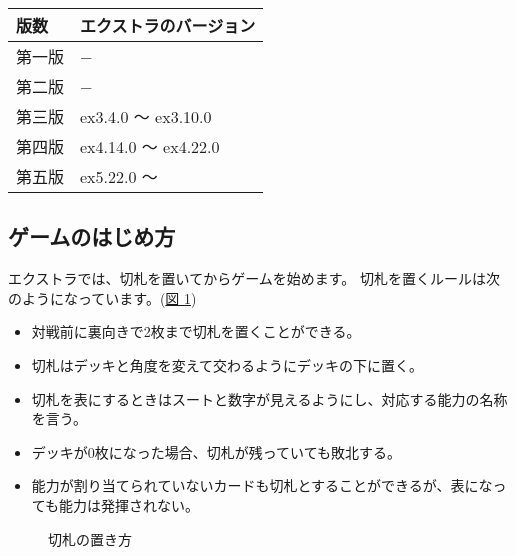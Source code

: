 \documentclass[letterpaper,10pt,dvipdfmx]{sphinxmanual}
\begin{document}
\begin{savenotes}\sphinxattablestart
\centering
{}
\sphinxthecaptionisattop
{}\label{\detokenize{common/06-extra:id11}}\label{\detokenize{common/06-extra:ver-ex}}
\sphinxaftertopcaption
\begin{tabulary}{\linewidth}[t]{|T|T|}
\hline
\sphinxstyletheadfamily 
版数
&\sphinxstyletheadfamily 
エクストラのバージョン
\\
\hline
第一版
&
−
\\
\hline
第二版
&
−
\\
\hline
第三版
&
ex3.4.0 〜 ex3.10.0
\\
\hline
第四版
&
ex4.14.0 〜 ex4.22.0
\\
\hline
第五版
&
ex5.22.0 〜
\\
\hline
\end{tabulary}
\par
\sphinxattableend\end{savenotes}


\subsection{ゲームのはじめ方}
\label{\detokenize{common/06-extra:id6}}
エクストラでは、切札を置いてからゲームを始めます。
切札を置くルールは次のようになっています。(\hyperref[\detokenize{common/06-extra:trump}]{図 \ref{\detokenize{common/06-extra:trump}}})
\begin{itemize}
\item {} 
対戦前に裏向きで2枚まで切札を置くことができる。

\item {} 
切札はデッキと角度を変えて交わるようにデッキの下に置く。

\item {} 
切札を表にするときはスートと数字が見えるようにし、対応する能力の名称を言う。

\item {} 
デッキが0枚になった場合、切札が残っていても敗北する。

\item {} 
能力が割り当てられていないカードも切札とすることができるが、表になっても能力は発揮されない。

\end{itemize}

\begin{figure}[htbp]
\centering
\capstart

\noindent{}
\caption{切札の置き方}\label{\detokenize{common/06-extra:id12}}\label{\detokenize{common/06-extra:trump}}\end{figure}
\end{document}
